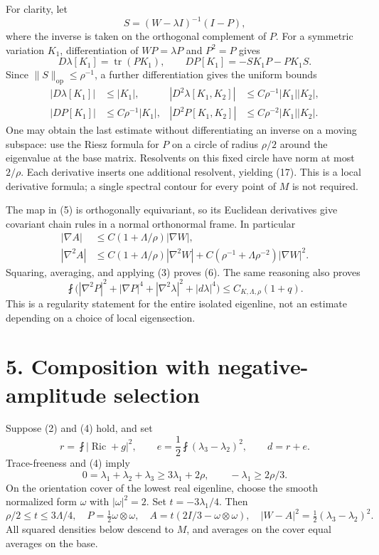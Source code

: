 \documentclass[
  11pt,
]{article}
\begin{document}
For clarity, let \[
 S=(W-\lambda I)^{-1}(I-P),
\] where the inverse is taken on the orthogonal complement of \(P\). For
a symmetric variation \(K_1\), differentiation of \(WP=\lambda P\) and
\(P^2=P\) gives \[
 D\lambda[K_1]=\operatorname{tr}(PK_1),\qquad
 DP[K_1]=-SK_1P-PK_1S.
 \tag{16}
\] Since \(\|S\|_{\mathrm{op}}\le\rho^{-1}\), a further differentiation
gives the uniform bounds \[
\begin{aligned}
 |D\lambda[K_1]|&\le |K_1|,&
 |D^2\lambda[K_1,K_2]|&\le C\rho^{-1}|K_1||K_2|,\\
 |DP[K_1]|&\le C\rho^{-1}|K_1|,&
 |D^2P[K_1,K_2]|&\le C\rho^{-2}|K_1||K_2|.
\end{aligned}
 \tag{17}
\] One may obtain the last estimate without differentiating an inverse
on a moving subspace: use the Riesz formula for \(P\) on a circle of
radius \(\rho/2\) around the eigenvalue at the base matrix. Resolvents
on this fixed circle have norm at most \(2/\rho\). Each derivative
inserts one additional resolvent, yielding (17). This is a local
derivative formula; a single spectral contour for every point of \(M\)
is not required.

The map in (5) is orthogonally equivariant, so its Euclidean derivatives
give covariant chain rules in a normal orthonormal frame. In particular
\[
\begin{split}
 |\nabla A|&\le C(1+\Lambda/\rho)|\nabla W|,\\
 |\nabla^2 A|&\le C(1+\Lambda/\rho)|\nabla^2W|
              +C(\rho^{-1}+\Lambda\rho^{-2})|\nabla W|^2.
\end{split}
 \tag{18}
\] Squaring, averaging, and applying (3) proves (6). The same reasoning
also proves \[
 \fint\bigl(|\nabla^2P|^2+|\nabla P|^4
                  +|\nabla^2\lambda|^2+|d\lambda|^4\bigr)
              \le C_{K,\Lambda,\rho}(1+q).
 \tag{19}
\] This is a regularity statement for the entire isolated eigenline, not
an estimate depending on a choice of local eigensection.

\hypertarget{composition-with-negative-amplitude-selection}{%
\section{5. Composition with negative-amplitude
selection}\label{composition-with-negative-amplitude-selection}}

Suppose (2) and (4) hold, and set \[
 r=\fint|\operatorname{Ric}+g|^2,\qquad
 e=\frac12\fint(\lambda_3-\lambda_2)^2,\qquad d=r+e.
 \tag{20}
\] Trace-freeness and (4) imply \[
 0=\lambda_1+\lambda_2+\lambda_3
       \ge3\lambda_1+2\rho,
 \qquad -\lambda_1\ge2\rho/3.
 \tag{21}
\] On the orientation cover of the lowest real eigenline, choose the
smooth normalized form \(\omega\) with \(|\omega|^2=2\). Set
\(t=-3\lambda_1/4\). Then \[
 \rho/2\le t\le3\Lambda/4,\quad
 P=\tfrac12\omega\otimes\omega,\quad
 A=t(2I/3-\omega\otimes\omega),\quad
 |W-A|^2=\tfrac12(\lambda_3-\lambda_2)^2.
 \tag{22}
\] All squared densities below descend to \(M\), and averages on the
cover equal averages on the base.
\end{document}
